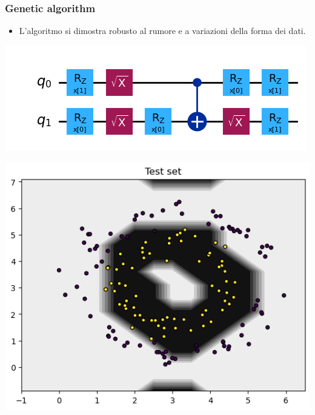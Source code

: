 \documentclass{beamer}
\begin{document}
\begin{frame}
  \frametitle{Genetic algorithm}
  \begin{itemize}
    \item L'algoritmo si dimostra robusto al rumore e a variazioni della forma dei dati.
  \end{itemize}
  \vspace{0.8cm}

  \begin{minipage}{0.5\textwidth}
    \centering
    \includegraphics[width=\textwidth]{images/finalcircuit.png}
\end{minipage}%
\begin{minipage}{0.5\textwidth}
    \centering
    \includegraphics[width=\textwidth]{images/noise.png}
\end{minipage}
\end{frame}
\end{document}
